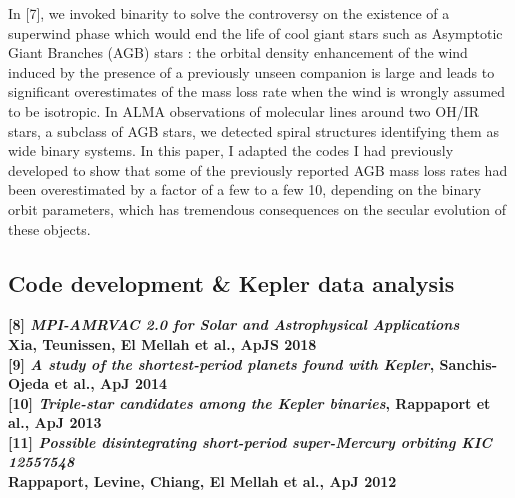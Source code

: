 \documentclass[letterpaper,12pt,onecolumn]{article}
\begin{document}
In [7], we invoked binarity to solve the controversy on the existence of a superwind phase which would end the life of cool giant stars such as Asymptotic Giant Branches (AGB) stars : the orbital density enhancement of the wind induced by the presence of a previously unseen companion is large and leads to significant overestimates of the mass loss rate when the wind is wrongly assumed to be isotropic. In ALMA observations of molecular lines around two OH/IR stars, a subclass of AGB stars, we detected spiral structures identifying them as wide binary systems. In this paper, I adapted the codes I had previously developed to show that some of the previously reported AGB mass loss rates had been overestimated by a factor of a few to a few 10, depending on the binary orbit parameters, which has tremendous consequences on the secular evolution of these objects.

\subsection*{Code development \& Kepler data analysis}

\footnotesize
\textbf{[8] \textit{MPI-AMRVAC 2.0 for Solar and Astrophysical Applications}}\\
\hspace*{16pt}\textbf{Xia, Teunissen, El Mellah et al., ApJS 2018}\\
\textbf{[9] \textit{A study of the shortest-period planets found with Kepler}, Sanchis-Ojeda et al., ApJ 2014}\\
\textbf{[10] \textit{Triple-star candidates among the Kepler binaries}, Rappaport et al., ApJ 2013}\\
\textbf{[11] \textit{Possible disintegrating short-period super-Mercury orbiting KIC 12557548}}\\
\hspace*{21pt}\textbf{Rappaport, Levine, Chiang, El Mellah et al., ApJ 2012}\\

\normalsize
\end{document}
